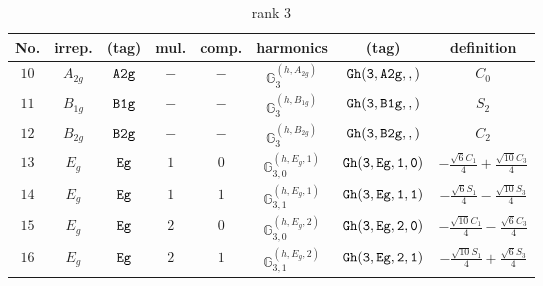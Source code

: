 \documentclass[fleqn,8pt]{jsarticle}
\begin{document}
\begin{table}[ht!]
\begin{center}
\caption{rank 3}
\renewcommand{\arraystretch}{1.3}
\begin{tabular}{cccccccc} \hline \hline
No. & irrep. & (tag) & mul. & comp. & harmonics & (tag) & definition \\ \hline
$ 10 $ & $ A_{2g} $ & $ {\tt A2g} $ & $ - $ & $ - $ & $ \mathbb{G}_{3}^{(h,A_{2g})} $ & $ {\tt Gh(3,A2g,,)} $ & $ C_{0} $ \\
$ 11 $ & $ B_{1g} $ & $ {\tt B1g} $ & $ - $ & $ - $ & $ \mathbb{G}_{3}^{(h,B_{1g})} $ & $ {\tt Gh(3,B1g,,)} $ & $ S_{2} $ \\
$ 12 $ & $ B_{2g} $ & $ {\tt B2g} $ & $ - $ & $ - $ & $ \mathbb{G}_{3}^{(h,B_{2g})} $ & $ {\tt Gh(3,B2g,,)} $ & $ C_{2} $ \\
$ 13 $ & $ E_{g} $ & $ {\tt Eg} $ & $ 1 $ & $ 0 $ & $ \mathbb{G}_{3,0}^{(h,E_{g},1)} $ & $ {\tt Gh(3,Eg,1,0)} $ & $ - \frac{\sqrt{6} C_{1}}{4} + \frac{\sqrt{10} C_{3}}{4} $ \\
$ 14 $ & $ E_{g} $ & $ {\tt Eg} $ & $ 1 $ & $ 1 $ & $ \mathbb{G}_{3,1}^{(h,E_{g},1)} $ & $ {\tt Gh(3,Eg,1,1)} $ & $ - \frac{\sqrt{6} S_{1}}{4} - \frac{\sqrt{10} S_{3}}{4} $ \\
$ 15 $ & $ E_{g} $ & $ {\tt Eg} $ & $ 2 $ & $ 0 $ & $ \mathbb{G}_{3,0}^{(h,E_{g},2)} $ & $ {\tt Gh(3,Eg,2,0)} $ & $ - \frac{\sqrt{10} C_{1}}{4} - \frac{\sqrt{6} C_{3}}{4} $ \\
$ 16 $ & $ E_{g} $ & $ {\tt Eg} $ & $ 2 $ & $ 1 $ & $ \mathbb{G}_{3,1}^{(h,E_{g},2)} $ & $ {\tt Gh(3,Eg,2,1)} $ & $ - \frac{\sqrt{10} S_{1}}{4} + \frac{\sqrt{6} S_{3}}{4} $ \\
 \hline \hline
\end{tabular}
\end{center}
\end{table}
\end{document}
